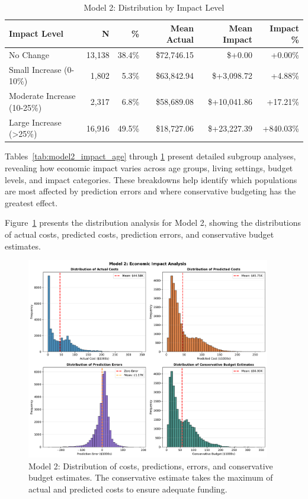 \begin{table}[htbp]
\centering
\small
\caption{Model 2: Distribution by Impact Level}
\label{tab:model2_impact_distribution}
\begin{tabular}{lrrrrr}
\toprule
\textbf{Impact Level} & \textbf{N} & \textbf{\%} & \textbf{Mean Actual} & \textbf{Mean Impact} & \textbf{Impact \%} \\
\midrule
No Change & 13,138 & 38.4\% & \$72,746.15 & \$+0.00 & +0.00\% \\
Small Increase (0-10\%) & 1,802 & 5.3\% & \$63,842.94 & \$+3,098.72 & +4.88\% \\
Moderate Increase (10-25\%) & 2,317 & 6.8\% & \$58,689.08 & \$+10,041.86 & +17.21\% \\
Large Increase (>25\%) & 16,916 & 49.5\% & \$18,727.06 & \$+23,227.39 & +840.03\% \\
\bottomrule
\end{tabular}
\end{table}

Tables~\ref{tab:model2_impact_age} through \ref{tab:model2_impact_distribution} present detailed subgroup analyses, revealing how economic impact varies across age groups, living settings, budget levels, and impact categories. These breakdowns help identify which populations are most affected by prediction errors and where conservative budgeting has the greatest effect.

Figure~\ref{fig:model2_impact_histograms} presents the distribution analysis for Model 2, showing the distributions of actual costs, predicted costs, prediction errors, and conservative budget estimates.

\begin{figure}[htbp]
\centering
\includegraphics[width=0.95\textwidth]{figures/model_2_Impact_Histograms.pdf}
\caption{Model 2: Distribution of costs, predictions, errors, and conservative budget estimates. The conservative estimate takes the maximum of actual and predicted costs to ensure adequate funding.}
\label{fig:model2_impact_histograms}
\end{figure}

